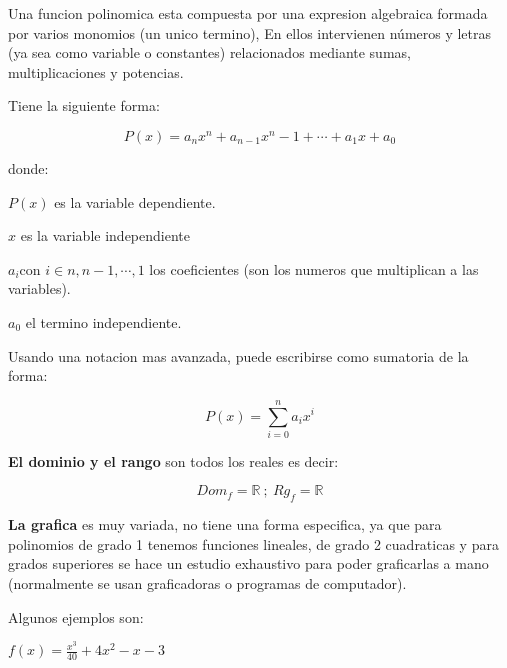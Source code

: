     Una funcion polinomica esta compuesta por una expresion algebraica formada por
    varios monomios (un unico termino), En ellos intervienen números y letras
    (ya sea como variable o constantes)
    relacionados mediante sumas, multiplicaciones y potencias.

    Tiene la siguiente forma:

    $$ P(x) = a_nx^n+ a_{n-1}x^n-1+\cdots+ a_1x+a_0 $$

    donde:

    $ P(x) $  es la variable dependiente.

    $x$ es la variable independiente

    $ a_i $con $ i\in {n,n-1,\cdots,1} $  los coeficientes (son los numeros que
    multiplican a las variables).

    $ a_0 $  el termino independiente.

    Usando una notacion mas avanzada, puede escribirse como sumatoria de la forma:


    $$ P(x)= \sum_{i=0}^{n}a_ix^i  $$


    \textbf{El dominio y el rango} son todos los reales es decir:

    $$ Dom_f={\mathbb{R}}\ ;\ Rg_f={\mathbb{R}} $$

    \textbf{La grafica} es muy variada, no tiene una forma especifica, ya que
    para polinomios de grado 1 tenemos funciones lineales, de grado 2 cuadraticas
    y para grados superiores se hace un estudio exhaustivo para poder graficarlas
    a mano (normalmente se usan graficadoras o programas de computador).

    Algunos ejemplos son:

    $ f(x)= \frac{x^3}{40}+4x^2-x-3 $



